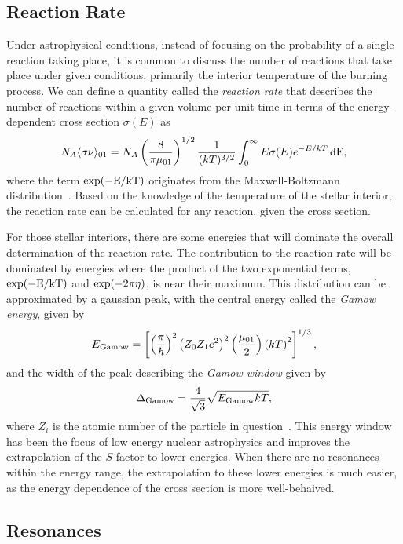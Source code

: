 \subsection{Reaction Rate}

Under astrophysical conditions, instead of focusing on the probability
of a single reaction taking place, it is common to discuss the number of
reactions that take place under given conditions, primarily the interior
temperature of the burning process. We can define a quantity called the
\emph{reaction rate} that describes the number of reactions within a
given volume per unit time in terms of the energy-dependent cross
section $\sigma(E)$ as
\begin{equation}
\label{eq:reaction-rate}
    N_A\langle\sigma\nu\rangle_{01} = N_A\left(\frac{8}{\pi\mu_{01}}\right)^{1/2}
        \frac{1}{(kT)^{3/2}}\int_0^{\infty} E\sigma(E)e^{-E/kT}\,\rm{d}E,
\end{equation}
where the term $\rm{exp}(-E/kT)$ originates from the Maxwell-Boltzmann
distribution~\cite{Iliadis}. Based on the knowledge of the temperature
of the stellar interior, the reaction rate can be calculated for any
reaction, given the cross section.

For those stellar interiors, there are some energies that will dominate
the overall determination of the reaction rate. The contribution to the
reaction rate will be dominated by energies where the product of the two
exponential terms, $\rm{exp}(-E/kT)$ and $\rm{exp}(-2\pi\eta)$, is near
their maximum. This distribution can be approximated by a gaussian peak,
with the central energy called the \emph{Gamow energy}, given by
\[
    E_{\rm{Gamow}} = \left[\left(\frac{\pi}{\hbar}\right)^2
        \left(Z_0Z_1e^2\right)^2\left(\frac{\mu_{01}}{2}\right)
        \left(kT\right)^2\right]^{1/3},
\]
and the width of the peak describing the \emph{Gamow window} given by
\[
    \Delta_{\rm{Gamow}} = \frac{4}{\sqrt{3}}\sqrt{E_{\rm{Gamow}}kT},
\]
where $Z_i$ is the atomic number of the particle in
question~\cite{Iliadis}. This energy window has been the focus of low
energy nuclear astrophysics and improves the extrapolation of the
$S$-factor to lower energies. When there are no resonances within the
energy range, the extrapolation to these lower energies is much easier,
as the energy dependence of the cross section is more well-behaived.

\subsection{Resonances}

